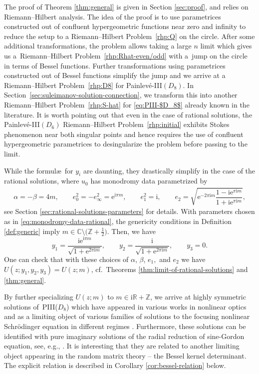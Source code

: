 \documentclass[11pt]{article}
\numberwithin{equation}{section}
\numberwithin{equation}{section}
\newcommand{\ee}{\mathrm{e}}
\newcommand{\ii}{\mathrm{i}}
\newcommand{\R}{{\mathbb{R}}}
\newcommand{\C}{{\mathbb{C}}}
\newcommand{\Z}{{\mathbb{Z}}}
\begin{document}
The proof of Theorem \ref{thm:general} is given in Section \ref{sec:proof}, and relies on Riemann--Hilbert analysis. The idea of the proof is to use parametrices constructed out of confluent hypergeometric functions near zero and infinity to reduce the setup to a Riemann--Hilbert Problem~\ref{rhp:Q} on the circle. After some additional transformations, the problem allows taking a large $n$ limit which gives us a~Riemann--Hilbert Problem~\ref{rhp:Rhat-even/odd} with a~jump on the circle in terms of Bessel functions. Further transformations using parametrices constructed out of Bessel functions simplify the jump and we arrive at a Riemann--Hilbert Problem~\ref{rhp:D8} for Painlev\'e-III$(D_8)$. In Section~\ref{sec:suleimanov-solution-connection}, we transform this into another Riemann--Hilbert Problem~\ref{rhp:S-hat} for \eqref{eq:PIII-$D_8$} already known in the literature. It is worth pointing out that even in the case of rational solutions, the Painlev\'e-III$(D_6)$ Riemann--Hilbert Problem~\ref{rhp:initial} exhibits Stokes phenomenon near both singular points \cite{BMS18} and hence requires the use of confluent hypergeometric parametrices to desingularize the problem before passing to the limit.

While the formul\ae\ for $y_i$ are daunting, they drastically simplify in the case of the rational solutions, where $u_0$ has monodromy data parametrized by
\begin{gather}
 \alpha = -\beta = 4m, \qquad e_0^2 = -e_\infty^2 = \ee^{\ii \pi m},\qquad
 e_1^2 = \ii, \qquad
 e_2 = \sqrt{\ee^{-2\pi \ii m}\dfrac{1 - \ii \ee^{\pi \ii m}}{1 + \ii \ee^{\pi \ii m}}},
\label{eq:monodromy-data-rational}
\end{gather}
see Section \ref{sec:rational-solutions-parameters} for details. With parameters chosen as in \eqref{eq:monodromy-data-rational}, the genericity conditions in Definition \ref{def:generic} imply $m \in \C \setminus \big(\Z + \frac{1}{2}\big)$. Then, we have
\[
y_1 = \frac{\ii \ee^{\ii\pi m}}{\sqrt{1+ \ee^{2\pi \ii m}}}, \qquad y_2 = \frac{\ii }{\sqrt{1+ \ee^{2\pi \ii m}}}, \qquad y_3 = 0.
\]
One can check that with these choices of $\alpha$, $\beta$, $e_1,$ and $e_2$ we have $U(z;y_1,y_2,y_3) = U(z;m)$, cf.\ Theorems \ref{thm:limit-of-rational-solutions} and \ref{thm:general}.

By further specializing $U(z;m)$ to $m \in \ii\R+ \Z$, we arrive at highly symmetric solutions of~PIII($D_8$) which have appeared in various works in nonlinear optics \cite{suleimanov} and as a limiting object of various families of solutions to the focusing nonlinear Schr\"odinger equation in different regimes \cite{MR4007631, BLM20}. Furthermore, these solutions can be identified with pure imaginary solutions of the radial reduction of sine-Gordon equation, see, e.g., \cite[Chapter 13]{FIKN}. It is interesting that they are related to another limiting object appearing in the random matrix theory -- the Bessel kernel determinant. The explicit relation is described in Corollary \ref{cor:bessel-relation} below.
\end{document}
